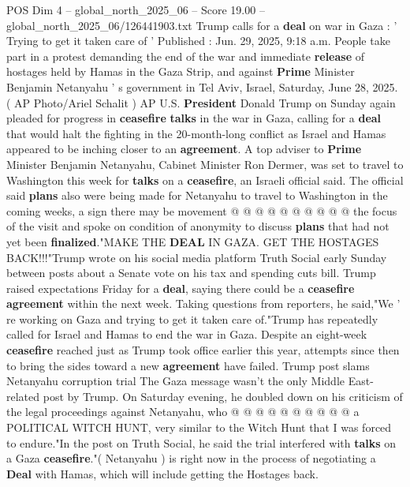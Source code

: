 \begin{textsample}{POS Dim 4 – global\_north\_2025\_06 – Score 19.00 – global\_north\_2025\_06/126441903.txt}  \label{ex:f4_pos_383}
Trump calls for a \textbf{deal} on war in Gaza : ' Trying to get it taken care of ' Published : Jun. 29, 2025, 9:18 a.m.
People take part in a protest demanding the end of the war and immediate \textbf{release} of hostages held by Hamas in the Gaza Strip, and against \textbf{Prime} Minister Benjamin Netanyahu ' s government in Tel Aviv, Israel, Saturday, June 28, 2025. ( AP Photo/Ariel Schalit ) AP U.S. \textbf{President} Donald Trump on Sunday again pleaded for progress in \textbf{ceasefire} \textbf{talks} in the war in Gaza, calling for a \textbf{deal} that would halt the fighting in the 20-month-long conflict as Israel and Hamas appeared to be inching closer to an \textbf{agreement}.
A top adviser to \textbf{Prime} Minister Benjamin Netanyahu, Cabinet Minister Ron Dermer, was set to travel to Washington this week for \textbf{talks} on a \textbf{ceasefire}, an Israeli official said.
The official said \textbf{plans} also were being made for Netanyahu to travel to Washington in the coming weeks, a sign there may be movement @ @ @ @ @ @ @ @ @ @ the focus of the visit and spoke on condition of anonymity to discuss \textbf{plans} that had not yet been \textbf{finalized}."MAKE THE \textbf{DEAL} IN GAZA.
GET THE HOSTAGES BACK!!!"Trump wrote on his social media platform Truth Social early Sunday between posts about a Senate vote on his tax and spending cuts bill.
Trump raised expectations Friday for a \textbf{deal}, saying there could be a \textbf{ceasefire} \textbf{agreement} within the next week.
Taking questions from reporters, he said,"We ' re working on Gaza and trying to get it taken care of."Trump has repeatedly called for Israel and Hamas to end the war in Gaza.
Despite an eight-week \textbf{ceasefire} reached just as Trump took office earlier this year, attempts since then to bring the sides toward a new \textbf{agreement} have failed.
Trump post slams Netanyahu corruption trial The Gaza message wasn't the only Middle East-related post by Trump.
On Saturday evening, he doubled down on his criticism of the legal proceedings against Netanyahu, who @ @ @ @ @ @ @ @ @ @ a POLITICAL WITCH HUNT, very similar to the Witch Hunt that I was forced to endure."In the post on Truth Social, he said the trial interfered with \textbf{talks} on a Gaza \textbf{ceasefire}."( Netanyahu ) is right now in the process of negotiating a \textbf{Deal} with Hamas, which will include getting the Hostages back.

\end{textsample}
